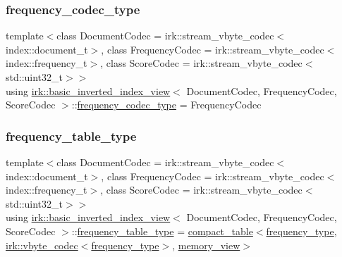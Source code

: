 \mbox{\label{classirk_1_1basic__inverted__index__view_a3d985daf7381825ddf7788611d03cb8f}} 
\subsubsection{\texorpdfstring{frequency\+\_\+codec\+\_\+type}{frequency\_codec\_type}}
{\footnotesize\ttfamily template$<$class Document\+Codec  = irk\+::stream\+\_\+vbyte\+\_\+codec$<$index\+::document\+\_\+t$>$, class Frequency\+Codec  = irk\+::stream\+\_\+vbyte\+\_\+codec$<$index\+::frequency\+\_\+t$>$, class Score\+Codec  = irk\+::stream\+\_\+vbyte\+\_\+codec$<$std\+::uint32\+\_\+t$>$$>$ \\
using \mbox{\hyperlink{classirk_1_1basic__inverted__index__view}{irk\+::basic\+\_\+inverted\+\_\+index\+\_\+view}}$<$ Document\+Codec, Frequency\+Codec, Score\+Codec $>$\+::\mbox{\hyperlink{classirk_1_1basic__inverted__index__view_a3d985daf7381825ddf7788611d03cb8f}{frequency\+\_\+codec\+\_\+type}} =  Frequency\+Codec}

\mbox{\label{classirk_1_1basic__inverted__index__view_a61954abd58d702c89a299a0e3ab78104}} 
\subsubsection{\texorpdfstring{frequency\+\_\+table\+\_\+type}{frequency\_table\_type}}
{\footnotesize\ttfamily template$<$class Document\+Codec  = irk\+::stream\+\_\+vbyte\+\_\+codec$<$index\+::document\+\_\+t$>$, class Frequency\+Codec  = irk\+::stream\+\_\+vbyte\+\_\+codec$<$index\+::frequency\+\_\+t$>$, class Score\+Codec  = irk\+::stream\+\_\+vbyte\+\_\+codec$<$std\+::uint32\+\_\+t$>$$>$ \\
using \mbox{\hyperlink{classirk_1_1basic__inverted__index__view}{irk\+::basic\+\_\+inverted\+\_\+index\+\_\+view}}$<$ Document\+Codec, Frequency\+Codec, Score\+Codec $>$\+::\mbox{\hyperlink{classirk_1_1basic__inverted__index__view_a61954abd58d702c89a299a0e3ab78104}{frequency\+\_\+table\+\_\+type}} =  \mbox{\hyperlink{classirk_1_1compact__table}{compact\+\_\+table}}$<$\mbox{\hyperlink{classirk_1_1basic__inverted__index__view_a01218db8d72e7ee07f3a9f71225f03c8}{frequency\+\_\+type}}, \mbox{\hyperlink{structirk_1_1vbyte__codec}{irk\+::vbyte\+\_\+codec}}$<$\mbox{\hyperlink{classirk_1_1basic__inverted__index__view_a01218db8d72e7ee07f3a9f71225f03c8}{frequency\+\_\+type}}$>$, \mbox{\hyperlink{classirk_1_1memory__view}{memory\+\_\+view}}$>$}

